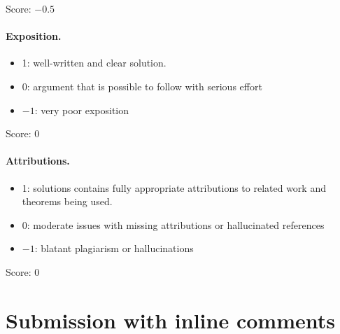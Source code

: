 \documentclass[11pt]{article}
\theoremstyle{definition}
\theoremstyle{remark}
\newcommand{\Q}{\mathbb Q}
\begin{document}
\noindent Score: $-0.5$

\paragraph{Exposition.}
\begin{itemize}
	\item  1: well-written and clear solution.
	\item  0: argument that is possible to follow with serious effort
	\item  $-1$: very poor exposition
\end{itemize}

\noindent Score: 0

\paragraph{Attributions.}
\begin{itemize}
	\item  1: solutions contains fully appropriate attributions
		to related work and theorems being used.
	\item  0: moderate issues with missing attributions or hallucinated references
	\item  $-1$: blatant plagiarism or hallucinations
\end{itemize}

\noindent Score: 0

\newpage
\section{Submission with inline comments}


\begin{abstract}
We examine the proposed correspondence between $H$-polarised Tyurin degenerations of K3 surfaces and elliptic fibrations on $H\oplus E_8\oplus E_8$-quasipolarised K3 surfaces, using the sign conventions in the cited definitions of Giovenzana--Thompson. For an elliptic fibration $W$ over a disc with boundary fibre $F$, we prove that their required component isometry forces $K_V^2=-\dim_{\Q}H_1(W,F;\Q)$. Thus a positive-degree rational component is impossible. We construct an $H$-polarised Tyurin degeneration with component degrees $1$ and $-1$, an effective flat nef Cartier divisor of positive square on both components, and boundary point outside all closures of proper interior Noether--Lefschetz loci. This gives a counterexample to the stated existence assertion. The obstruction depends on the simultaneous choices of fibre intersection, clockwise displacement in the Seifert pairing, and anticlockwise monodromy; it makes no assertion about a correspondence with modified conventions.
\end{abstract}
\end{document}
